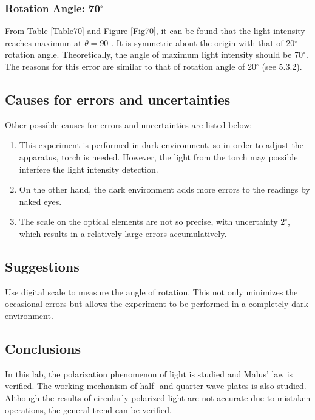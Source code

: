 \documentclass{article}
\begin{document}
\subsubsection{Rotation Angle: 70$^\circ$}

From Table \ref{Table70} and Figure \ref{Fig70}, it can be found that the light intensity reaches maximum at  $\theta = 90^\circ$. It is symmetric about the origin with that of 20$^\circ$ rotation angle. Theoretically, the angle of maximum light intensity should be 70$^\circ$. The reasons for this error are similar to that of rotation angle of 20$^\circ$ (see 5.3.2).   

\subsection{Causes for errors and uncertainties}

Other possible causes for errors and uncertainties are listed below:

\begin{enumerate}
\item This experiment is performed in dark environment, so in order to adjust the apparatus, torch is needed. However, the light from the torch may possible interfere the light intensity detection.
\item On the other hand, the dark environment adds more errors to the readings by naked eyes.
 \item The  scale on the optical elements are not so precise, with uncertainty $2^\circ$, which results in a relatively large errors accumulatively.
\end{enumerate}

\subsection{Suggestions}

Use digital scale to measure the angle of rotation. This not only minimizes the occasional errors but allows the experiment to be performed in a completely dark environment.

\subsection{Conclusions}
In this lab, the polarization phenomenon of light is studied and Malus' law is verified. The working mechanism of half- and quarter-wave plates is also studied. Although the results of circularly polarized light are not accurate due to mistaken operations, the general trend can be verified.
\end{document}
